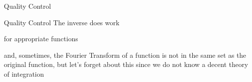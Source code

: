     \begin{frame}{Quality Control}
    \end{frame}
    
    \begin{frame}{Quality Control}
        \centering
        \huge{The inverse does work}
        
        \normalsize{for appropriate functions}
        
        \tiny{and, sometimes, the Fourier Transform of a function is not in the same set as the original function, but let's forget about this since we do not know a decent theory of integration}
    \end{frame}